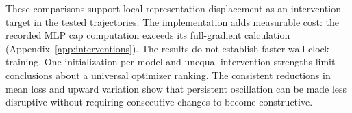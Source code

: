 These comparisons support local representation displacement as an
intervention target in the tested trajectories. The implementation adds
measurable cost: the recorded MLP cap computation exceeds its full-gradient
calculation (Appendix~\ref{app:interventions}). The results do not establish
faster wall-clock training. One initialization per model and unequal
intervention strengths limit conclusions about a universal optimizer
ranking. The consistent reductions in mean loss and upward variation
show that persistent oscillation can be made less disruptive without
requiring consecutive changes to become constructive.
